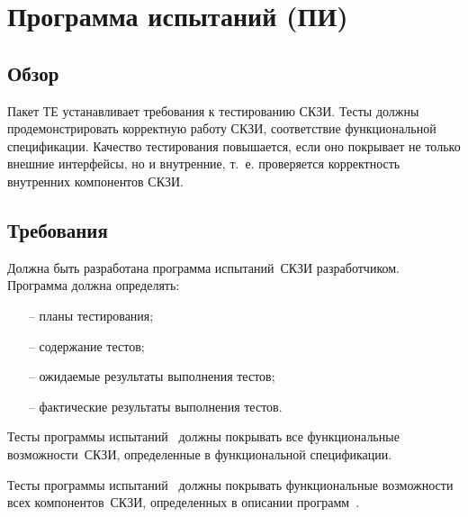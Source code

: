 \section{Программа испытаний (ПИ)}\label{TE}

\subsection{Обзор}\label{TE.Intro}

Пакет ТЕ устанавливает требования к тестированию СКЗИ.
%
Тесты должны продемонстрировать корректную работу СКЗИ, 
соответствие функциональной спецификации.
%
Качество тестирования повышается, если оно покрывает не только внешние 
интерфейсы, но и внутренние, т.~е. проверяется корректность 
внутренних компонентов СКЗИ.

\subsection{Требования}\label{TE.Reqs}

\label{R.TE.Prg}
Должна быть разработана программа испытаний~СКЗИ разработчиком.
Программа должна определять:
\begin{itemize}
\item[--]
планы тестирования;
\item[--]
содержание тестов;
\item[--]
ожидаемые результаты выполнения тестов;
\item[--]
фактические результаты выполнения тестов.
\end{itemize}

\label{R.TE.Coverage}
Тесты программы испытаний~ должны 
покрывать все функциональные возможности~СКЗИ, 
определенные в функциональной спецификации.

\label{R.TE.Deep}
Тесты программы испытаний~ должны 
покрывать функциональные возможности всех компонентов~СКЗИ, 
определенных в описании программ~.

